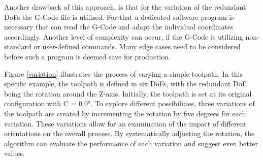 \documentclass[conference]{IEEEtran}
\begin{document}
Another drawback of this approach, is that for the variation of the redundant DoFs the G-Code file is utilized. For that a dedicated software-program is necessary that can read the G-Code and adapt the individual coordinates accordingly. Another level of complexity can occur, if the G-Code is utilizing non-standard or user-defined commands. Many edge cases need to be considered before such a program is deemed save for production.       

Figure \ref{variation} illustrates the process of varying a simple toolpath. In this specific example, the toolpath is defined in six DoFs, with the redundant DoF being the rotation around the Z-axis. Initially, the toolpath is set at its original configuration with C = 0.0°. To explore different possibilities, three variations of the toolpath are created by incrementing the rotation by five degrees for each variation. These variations allow for an examination of the impact of different orientations on the overall process. By systematically adjusting the rotation, the algorithm can evaluate the performance of each variation and suggest even better values.




\newpage


\printbibliography
\end{document}
